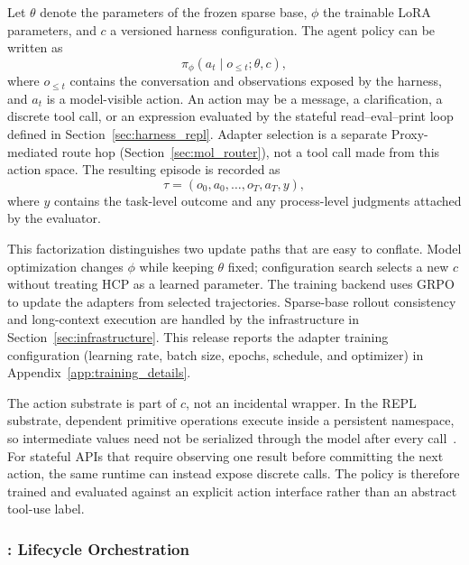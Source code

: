 Let \(\theta\) denote the parameters of the frozen sparse base, \(\phi\) the trainable LoRA parameters, and \(c\) a versioned harness configuration. The agent policy can be written as
\begin{equation}
  \pi_{\phi}(a_t \mid o_{\leq t}; \theta, c),
\end{equation}
where \(o_{\leq t}\) contains the conversation and observations exposed by the harness, and \(a_t\) is a model-visible action. An action may be a message, a clarification, a discrete tool call, or an expression evaluated by the stateful read--eval--print loop defined in Section~\ref{sec:harness_repl}. Adapter selection is a separate Proxy-mediated route hop (Section~\ref{sec:mol_router}), not a tool call made from this action space. The resulting episode is recorded as
\begin{equation}
  \tau=(o_0,a_0,\ldots,o_T,a_T,y),
\end{equation}
where \(y\) contains the task-level outcome and any process-level judgments attached by the evaluator.

This factorization distinguishes two update paths that are easy to conflate. Model optimization changes \(\phi\) while keeping \(\theta\) fixed; configuration search selects a new \(c\) without treating HCP as a learned parameter. The training backend uses GRPO~\citep{shao2024deepseekmath} to update the adapters from selected trajectories. Sparse-base rollout consistency and long-context execution are handled by the infrastructure in Section~\ref{sec:infrastructure}. This release reports the adapter training configuration (learning rate, batch size, epochs, schedule, and optimizer) in Appendix~\ref{app:training_details}.

The action substrate is part of \(c\), not an incidental wrapper. In the REPL substrate, dependent primitive operations execute inside a persistent namespace, so intermediate values need not be serialized through the model after every call~\citep{wu2026replharnesses}. For stateful APIs that require observing one result before committing the next action, the same runtime can instead expose discrete calls. The policy is therefore trained and evaluated against an explicit action interface rather than an abstract tool-use label.

\subsubsection{\mindforge: Lifecycle Orchestration}
\label{sec:rsi_mindforge}

